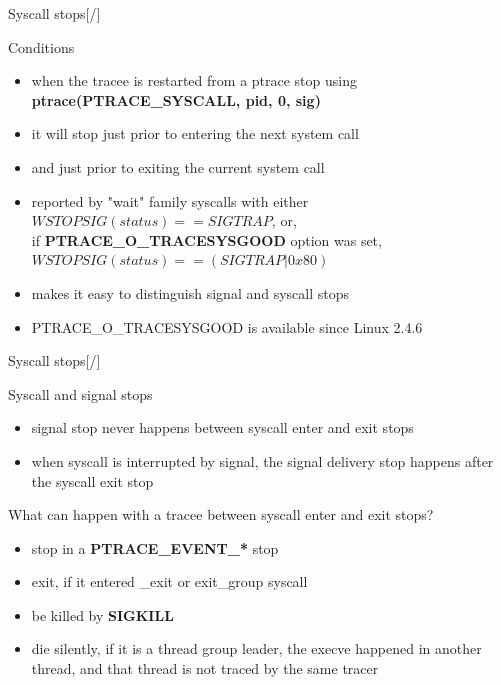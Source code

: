 \documentclass[unicode,aspectratio=169,xcolor={table,dvipsnames,usenames}]{beamer}
\begin{document}
\begin{frame}{\Large Syscall stops\hfill [\insertframenumber/\inserttotalframenumber]}
\Large
\begin{block}{Conditions}
\begin{itemize}
	\item when the tracee is restarted from a ptrace stop using \\
		\textbf{ptrace(PTRACE\_SYSCALL, pid, 0, sig)}
	\item it will stop just prior to entering the next system call
	\item and just prior to exiting the current system call
	\item reported by "wait" family syscalls with either \\
		$WSTOPSIG(status) == SIGTRAP$, or, \\
		if \textbf{PTRACE\_O\_TRACESYSGOOD} option was set, \\
		$WSTOPSIG(status) == (SIGTRAP | 0x80)$
	\item makes it easy to distinguish signal and syscall stops
	\item PTRACE\_O\_TRACESYSGOOD is available since Linux 2.4.6
\end{itemize}
\end{block}
\end{frame}

\begin{frame}{\Large Syscall stops\hfill [\insertframenumber/\inserttotalframenumber]}
\Large
\begin{block}{Syscall and signal stops}
\begin{itemize}
	\item signal stop never happens between syscall enter and exit stops
	\item when syscall is interrupted by signal, the signal delivery stop happens after the syscall exit stop
\end{itemize}
\end{block}

\begin{block}{What can happen with a tracee between syscall enter and exit stops?}
\begin{itemize}
	\item stop in a \textbf{PTRACE\_EVENT\_*} stop
	\item exit, if it entered \_exit or exit\_group syscall
	\item be killed by \textbf{SIGKILL}
	\item die silently, if it is a thread group leader, the execve happened
		in another thread, and that thread is not traced by the same tracer
\end{itemize}
\end{block}
\end{frame}
\end{document}
